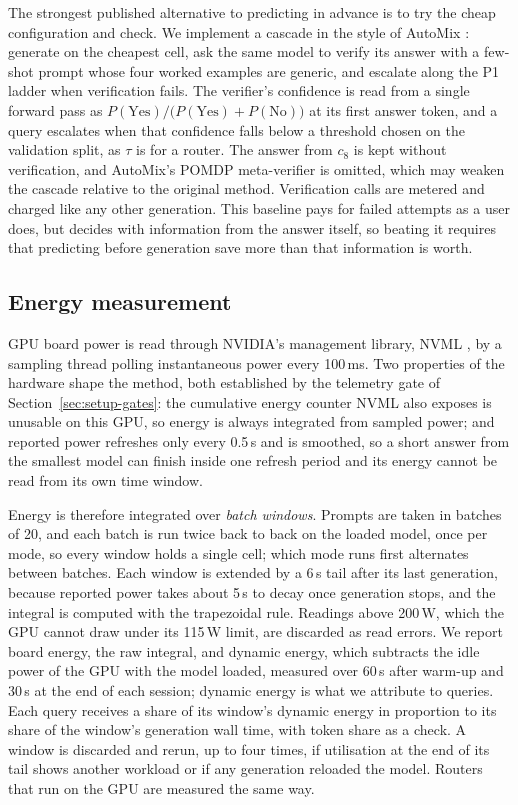 \documentclass[final,5p,times,twocolumn]{elsarticle}
\theoremstyle{plain}
\begin{document}
The strongest published alternative to predicting in advance is to try the
cheap configuration and check. We implement a cascade in the style of AutoMix
\cite{aggarwal2024automix}: generate on the cheapest cell, ask the same model
to verify its answer with a few-shot prompt whose four worked examples are
generic, and escalate along the P1 ladder when verification fails. The
verifier's confidence is read from a single forward pass as
$P(\text{Yes})/\bigl(P(\text{Yes}) + P(\text{No})\bigr)$ at its first answer
token, and a query escalates when that confidence falls below a threshold
chosen on the validation split, as $\tau$ is for a router. The answer from
$c_8$ is kept without verification, and AutoMix's POMDP meta-verifier is
omitted, which may weaken the cascade relative to the original method.
Verification calls are metered and charged like any other generation. This
baseline pays for failed attempts as a user does, but decides with
information from the answer itself, so beating it requires that predicting
before generation save more than that information is worth.

\subsection{Energy measurement}
\label{sec:energy}

GPU board power is read through NVIDIA's management library, NVML
\cite{nvidia_nvml}, by a sampling thread polling instantaneous power every
100\,ms. Two properties of the hardware shape the method, both established by
the telemetry gate of Section~\ref{sec:setup-gates}: the cumulative energy
counter NVML also exposes is unusable on this GPU, so energy is always
integrated from sampled power; and reported power refreshes only every 0.5\,s
and is smoothed, so a short answer from the smallest model can finish inside
one refresh period and its energy cannot be read from its own time window.

Energy is therefore integrated over \emph{batch windows}. Prompts are taken
in batches of 20, and each batch is run twice back to back on the loaded
model, once per mode, so every window holds a single cell; which mode runs
first alternates between batches. Each window is extended by a 6\,s tail after
its last generation, because reported power takes about 5\,s to decay once
generation stops, and the integral is computed with the trapezoidal rule.
Readings above 200\,W, which the GPU cannot draw under its 115\,W limit, are
discarded as read errors. We report board energy, the raw integral, and
dynamic energy, which subtracts the idle power of the GPU with the model
loaded, measured over 60\,s after warm-up and 30\,s at the end of each
session; dynamic energy is what we attribute to queries. Each query receives
a share of its window's dynamic energy in proportion to its share of the
window's generation wall time, with token share as a check. A window is
discarded and rerun, up to four times, if utilisation at the end of its tail
shows another workload or if any generation reloaded the model. Routers that
run on the GPU are measured the same way.
\end{document}
